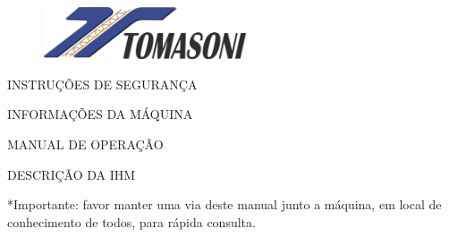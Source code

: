 \thispagestyle{empty}
\setcounter{page}{0}

\begin{figure}[h]
    \begin{minipage}{0.4\textwidth}
    \includegraphics[width=6cm]{logoTomasoni.png}
    \end{minipage}
    \hspace{0.5cm}
    \end{figure}
    

\vspace*{\fill}
\begin{center}
    \huge\textbf{\machineName}
\end{center}
\begin{center}
    \Large{INSTRUÇÕES DE SEGURANÇA}
\end{center}
\begin{center}
    \Large{INFORMAÇÕES DA MÁQUINA}
\end{center}
\begin{center}
    \Large{MANUAL DE OPERAÇÃO}
\end{center}
\begin{center}
    \Large{DESCRIÇÃO DA IHM}
\end{center}

\vspace*{\fill}

*Importante: favor manter uma via deste manual junto a máquina, em local de conhecimento de todos, para rápida consulta.


